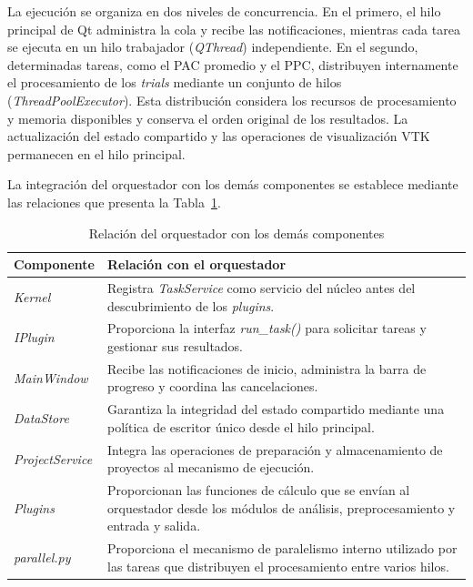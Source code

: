 \documentclass[12pt,letterpaper,oneside]{article}
\begin{document}
La ejecución se organiza en dos niveles de concurrencia. En el primero, el hilo principal de Qt administra la cola y recibe las notificaciones, mientras cada tarea se ejecuta en un hilo trabajador (\textit{QThread}) independiente. En el segundo, determinadas tareas, como el PAC promedio y el PPC, distribuyen internamente el procesamiento de los \textit{trials} mediante un conjunto de hilos (\textit{ThreadPoolExecutor}). Esta distribución considera los recursos de procesamiento y memoria disponibles y conserva el orden original de los resultados. La actualización del estado compartido y las operaciones de visualización VTK permanecen en el hilo principal.

La integración del orquestador con los demás componentes se establece mediante las relaciones que presenta la Tabla~\ref{tab:relaciones-orquestador}.

\begin{table}[H]
  \centering
  \small{}
  \renewcommand{\arraystretch}{1.15}
  \begin{tabular}{|>{\raggedright\arraybackslash}p{3.2cm}|>{\raggedright\arraybackslash}p{11.3cm}|}
    \hline
    \textbf{Componente} & \textbf{Relación con el orquestador} \\ \hline
    \textit{Kernel} & Registra \textit{TaskService} como servicio del núcleo antes del descubrimiento de los \textit{plugins}. \\ \hline
    \textit{IPlugin} & Proporciona la interfaz \textit{run\_task()} para solicitar tareas y gestionar sus resultados. \\ \hline
    \textit{MainWindow} & Recibe las notificaciones de inicio, administra la barra de progreso y coordina las cancelaciones. \\ \hline
    \textit{DataStore} & Garantiza la integridad del estado compartido mediante una política de escritor único desde el hilo principal. \\ \hline
    \textit{ProjectService} & Integra las operaciones de preparación y almacenamiento de proyectos al mecanismo de ejecución. \\ \hline
    \textit{Plugins} & Proporcionan las funciones de cálculo que se envían al orquestador desde los módulos de análisis, preprocesamiento y entrada y salida. \\ \hline
    \textit{parallel.py} & Proporciona el mecanismo de paralelismo interno utilizado por las tareas que distribuyen el procesamiento entre varios hilos. \\ \hline
  \end{tabular}
\caption{Relación del orquestador con los demás componentes}
\label{tab:relaciones-orquestador}
\end{table}
\end{document}
